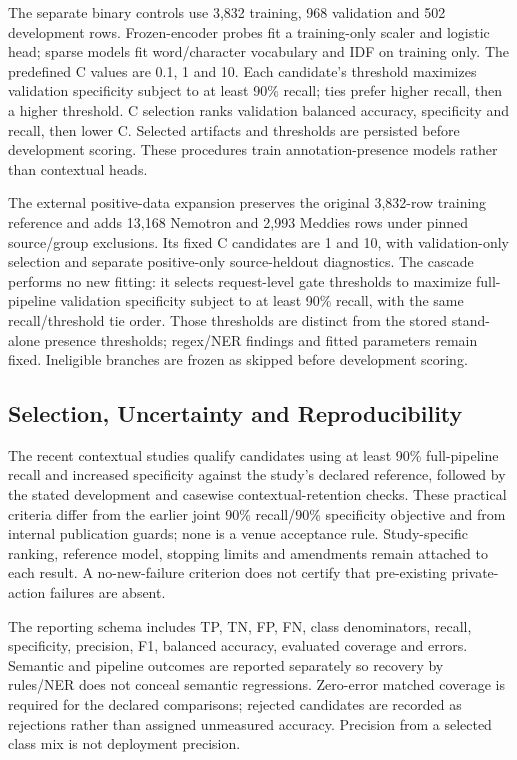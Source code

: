 \documentclass[conference]{IEEEtran}
\begin{document}
The separate binary controls use 3,832 training, 968 validation and 502 development rows. Frozen-encoder probes fit a training-only scaler and logistic head; sparse models fit word/character vocabulary and IDF on training only. The predefined C values are 0.1, 1 and 10. Each candidate's threshold maximizes validation specificity subject to at least 90\% recall; ties prefer higher recall, then a higher threshold. C selection ranks validation balanced accuracy, specificity and recall, then lower C. Selected artifacts and thresholds are persisted before development scoring. These procedures train annotation-presence models rather than contextual heads.

The external positive-data expansion preserves the original 3,832-row training reference and adds 13,168 Nemotron and 2,993 Meddies rows under pinned source/group exclusions. Its fixed C candidates are 1 and 10, with validation-only selection and separate positive-only source-heldout diagnostics. The cascade performs no new fitting: it selects request-level gate thresholds to maximize full-pipeline validation specificity subject to at least 90\% recall, with the same recall/threshold tie order. Those thresholds are distinct from the stored stand-alone presence thresholds; regex/NER findings and fitted parameters remain fixed. Ineligible branches are frozen as skipped before development scoring.

\subsection{Selection, Uncertainty and Reproducibility}

The recent contextual studies qualify candidates using at least 90\% full-pipeline recall and increased specificity against the study's declared reference, followed by the stated development and casewise contextual-retention checks. These practical criteria differ from the earlier joint 90\% recall/90\% specificity objective and from internal publication guards; none is a venue acceptance rule. Study-specific ranking, reference model, stopping limits and amendments remain attached to each result. A no-new-failure criterion does not certify that pre-existing private-action failures are absent.

The reporting schema includes TP, TN, FP, FN, class denominators, recall, specificity, precision, F1, balanced accuracy, evaluated coverage and errors. Semantic and pipeline outcomes are reported separately so recovery by rules/NER does not conceal semantic regressions. Zero-error matched coverage is required for the declared comparisons; rejected candidates are recorded as rejections rather than assigned unmeasured accuracy. Precision from a selected class mix is not deployment precision.
\end{document}
